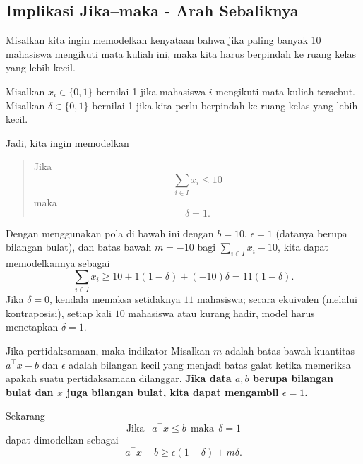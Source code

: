 \subsection{Implikasi Jika--maka - Arah Sebaliknya}
Misalkan kita ingin memodelkan kenyataan bahwa jika paling banyak 10 mahasiswa mengikuti mata kuliah ini, maka kita harus berpindah ke ruang kelas yang lebih kecil.

Misalkan $x_i \in \{0,1\}$ bernilai 1 jika mahasiswa $i$ mengikuti mata kuliah tersebut. Misalkan $\delta \in \{0,1\}$ bernilai 1 jika kita perlu berpindah ke ruang kelas yang lebih kecil.

Jadi, kita ingin memodelkan
\begin{quote}
Jika $$
\sum_{i \in I} x_i \leq 10
$$
maka
$$
\delta = 1.
$$
\end{quote}

Dengan menggunakan pola di bawah ini dengan $b = 10$, $\epsilon = 1$ (datanya berupa bilangan bulat), dan batas bawah $m = -10$ bagi $\sum_{i \in I} x_i - 10$, kita dapat memodelkannya sebagai
\begin{equation}
\sum_{i \in I} x_i \geq 10 + 1(1-\delta) + (-10)\delta = 11(1 - \delta).
\end{equation}
Jika $\delta = 0$, kendala memaksa setidaknya $11$ mahasiswa; secara ekuivalen (melalui kontraposisi), setiap kali $10$ mahasiswa atau kurang hadir, model harus menetapkan $\delta = 1$.


\begin{general}{Jika pertidaksamaan, maka indikator}{}
Misalkan $m$ adalah batas bawah kuantitas $a^\top x - b$ dan $\epsilon$ adalah bilangan kecil yang menjadi batas galat ketika memeriksa apakah suatu pertidaksamaan dilanggar. \textbf{Jika data $a,b$ berupa bilangan bulat dan $x$ juga bilangan bulat, kita dapat mengambil $\epsilon = 1$.}

Sekarang
\begin{equation}
\text{Jika } \ \ a^\top x \leq b  \ \ \text{maka}\ \ \delta = 1
\end{equation}
dapat dimodelkan sebagai
\begin{equation}
a^\top x -b  \geq  \epsilon(1-\delta) + m \delta.
\end{equation}
\end{general}



